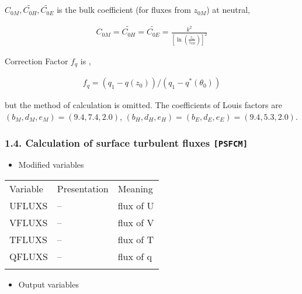 \(C_{0M}, \widetilde{C_{0H}}, \widetilde{C_{0E}}\) is the bulk
coefficient (for fluxes from \(z_{0M}\)) at neutral,

\begin{eqnarray}
    C_{0M}  =  \widetilde{C_{0H}}  =  \widetilde{C_{0E}}  =
       \frac{k^2}{\left[\ln \left(\frac{z_1}{z_{0M}}\right)\right]^2 }
\end{eqnarray}

Correction Factor \(f_q\) is ,

\begin{eqnarray}
  f_q = (q_1 - q(z_0))/(q_1 - q^{\ast}(\theta_0))
\end{eqnarray}

but the method of calculation is omitted. The coefficients of Louis
factors are \(( b_M, d_M, e_M ) = ( 9.4, 7.4, 2.0 )\),
\(( b_H, d_H, e_H ) = ( b_E, d_E, e_E ) = ( 9.4, 5.3, 2.0 )\).

\hypertarget{calculation-of-surface-turbulent-fluxes-psfcm}{%
\subsubsection{\texorpdfstring{1.4. Calculation of surface turbulent
fluxes
\texttt{{[}PSFCM{]}}}{1.4. Calculation of surface turbulent fluxes {[}PSFCM{]}}}\label{calculation-of-surface-turbulent-fluxes-psfcm}}

\begin{itemize}
\tightlist
\item
  Modified variables
\end{itemize}

\setlength\LTleft{0pt}\setlength\LTright{0pt}\begin{longtable}[]{@{}lll@{}}
\toprule\relax
Variable & Presentation & Meaning \\ \addlinespace
\midrule\relax
\endhead
UFLUXS & -- & flux of U \\ \addlinespace
VFLUXS & -- & flux of V \\ \addlinespace
TFLUXS & -- & flux of T \\ \addlinespace
QFLUXS & -- & flux of q \\ \addlinespace
\bottomrule
\end{longtable}

\begin{itemize}
\tightlist
\item
  Output variables
\end{itemize}

